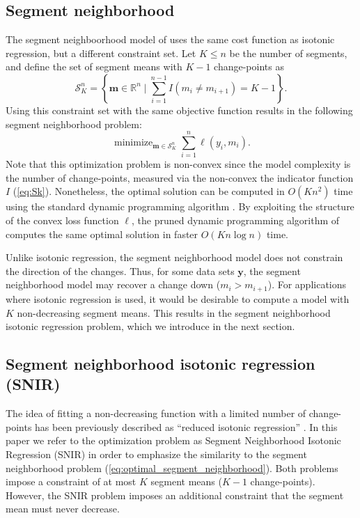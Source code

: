 \documentclass{article}
\DeclareMathOperator*{\minimize}{minimize}
\newcommand{\RR}{\mathbb R}
\begin{document}
\subsection{Segment neighborhood}

The segment neighboorhood model of \citet{segment-neighborhood} uses
the same cost function as isotonic regression, but a different
constraint set. Let $K\leq n$ be the number of segments, and define
the set of segment means with $K-1$ change-points as
\begin{equation}
  \label{eq:Sk}
  \mathcal S_K^n = \left\{
  \mathbf m\in\RR^n
  \mid
  \sum_{i=1}^{n-1} I(m_i \neq m_{i+1}) = K-1
  \right\}.
\end{equation}
Using this constraint set with the same objective function results in
the following segment neighborhood problem:
\begin{equation}
  \label{eq:optimal_segment_neighborhood}
  \minimize_{\mathbf m\in\mathcal S_K^n} \sum_{i=1}^n \ell(y_i, m_i).
\end{equation}
Note that this optimization problem is non-convex since the model
complexity is the number of change-points, measured via the non-convex
the indicator function $I$ (\ref{eq:Sk}). Nonetheless, the optimal
solution can be computed in $O(K n^2)$ time using the standard dynamic
programming algorithm \citep{segment-neighborhood}. By exploiting the
structure of the convex loss function $\ell$, the pruned dynamic
programming algorithm of \citet{pruned-dp} computes the same optimal
solution in faster $O(K n \log n)$ time.

Unlike isotonic regression, the segment neighborhood model
does not constrain the direction of the changes. Thus, for some
data sets $\mathbf y$, the segment neighborhood model may
recover a change down ($m_i > m_{i+1}$). For applications where
isotonic regression is used, it would be desirable to compute a model
with $K$ non-decreasing segment means. This results in the segment neighborhood
isotonic regression problem, which we introduce in the next section.

\subsection{Segment neighborhood isotonic regression (SNIR)}

The idea of fitting a non-decreasing function with a limited number of
change-points has been previously described as ``reduced isotonic
regression'' \citep{reduced-monotonic-regression,
  hardwick2014optimal}. In this paper we refer to the optimization
problem as Segment Neighborhood Isotonic Regression (SNIR) in order to
emphasize the similarity to the segment neighborhood problem
(\ref{eq:optimal_segment_neighborhood}). Both problems impose a
constraint of at most $K$ segment means ($K-1$
change-points). However, the SNIR problem imposes an additional
constraint that the segment mean must never decrease.
\end{document}
